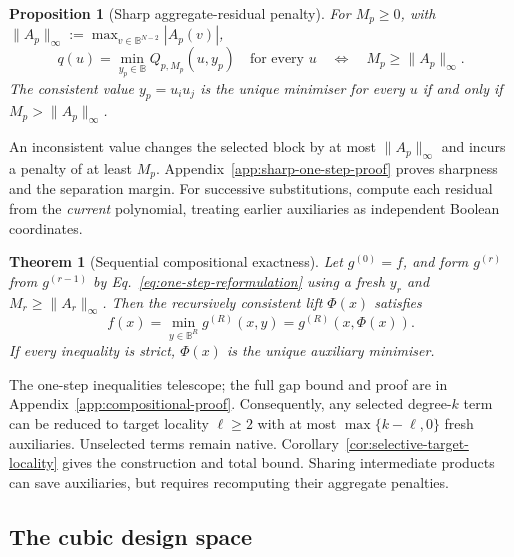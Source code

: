 \documentclass[a4paper,onecolumn,11pt,unpublished]{quantumarticle}
\newtheorem{theorem}[theorem]{Theorem}
\newtheorem{proposition}[proposition]{Proposition}
\theoremstyle{remark}
\begin{document}
\begin{proposition}[Sharp aggregate-residual penalty]
\label{prop:sharp-aggregate-residual}
For $M_p\geq0$, with $\|A_p\|_\infty:=\max_{v\in\mathbb B^{N-2}}|A_p(v)|$,
\begin{equation}
q(u)=\min_{y_p\in\mathbb B}Q_{p,M_p}(u,y_p)\quad\text{for every }u
\quad\Longleftrightarrow\quad M_p\geq\|A_p\|_\infty.
\label{eq:sharp-one-step-threshold}
\end{equation}
The consistent value $y_p=u_i u_j$ is the unique minimiser for every $u$
if and only if $M_p>\|A_p\|_\infty$.
\end{proposition}

An inconsistent value changes the selected block by at most
$\|A_p\|_\infty$ and incurs a penalty of at least $M_p$.
Appendix~\ref{app:sharp-one-step-proof} proves sharpness and the separation
margin. For successive substitutions, compute each residual from the
\emph{current} polynomial, treating earlier auxiliaries as independent
Boolean coordinates.

\begin{theorem}[Sequential compositional exactness]
\label{thm:sequential-compositional-exactness}
Let $g^{(0)}=f$, and form $g^{(r)}$ from $g^{(r-1)}$ by
Eq.~\eqref{eq:one-step-reformulation} using a fresh $y_r$ and
$M_r\geq\|A_r\|_\infty$. Then the recursively consistent lift $\Phi(x)$ satisfies
\begin{equation}
f(x)=\min_{y\in\mathbb B^R}g^{(R)}(x,y)=g^{(R)}(x,\Phi(x)).
\label{eq:compositional-exactness}
\end{equation}
If every inequality is strict, $\Phi(x)$ is the unique auxiliary minimiser.
\end{theorem}

The one-step inequalities telescope; the full gap bound and proof are in
Appendix~\ref{app:compositional-proof}. Consequently, any selected degree-$k$
term can be reduced to target locality $\ell\geq2$ with at most
$\max\{k-\ell,0\}$ fresh auxiliaries. Unselected terms remain native.
Corollary~\ref{cor:selective-target-locality} gives the construction and total
bound. Sharing intermediate products can save auxiliaries, but requires
recomputing their aggregate penalties.

\subsection{The cubic design space}
\label{sec:cubic-specialisation}
\end{document}
